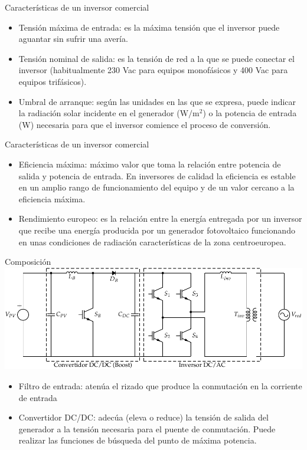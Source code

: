 \documentclass[xcolor={usenames,svgnames,dvipsnames}]{beamer}
\begin{document}
\begin{frame}[label=sec-2-0-7]{Características de un inversor comercial}
\begin{itemize}
\item \alert{Tensión máxima de entrada}: es la máxima tensión que el inversor
puede aguantar sin sufrir una avería.

\item \alert{Tensión nominal de salida}: es la tensión de red a la que se puede
conectar el inversor (habitualmente 230 Vac para equipos monofásicos
y 400 Vac para equipos trifásicos).

\item \alert{Umbral de arranque}: según las unidades en las que se expresa, puede
indicar la radiación solar incidente en el generador
($\si{\watt\per\meter\squared}$) o la potencia de entrada (W)
necesaria para que el inversor comience el proceso de conversión.
\end{itemize}
\end{frame}

\begin{frame}[label=sec-2-0-8]{Características de un inversor comercial}
\begin{itemize}
\item \alert{Eficiencia máxima}: máximo valor que toma la relación entre potencia
de salida y potencia de entrada. En inversores de calidad la
eficiencia es estable en un amplio rango de funcionamiento del equipo
y de un valor cercano a la eficiencia máxima.

\item \alert{Rendimiento europeo}: es la relación entre la energía entregada por
un inversor que recibe una energía producida por un generador
fotovoltaico funcionando en unas condiciones de radiación
características de la zona centroeuropea.
\end{itemize}
\end{frame}

\begin{frame}[label=sec-2-0-9]{Composición}
\includegraphics[width=.9\linewidth]{../figs/InversorPV.pdf}

\begin{itemize}
\item \alert{Filtro de entrada}: atenúa el rizado que produce la conmutación en
la corriente de entrada

\item \alert{Convertidor DC/DC}: adecúa (eleva o reduce) la tensión de salida del
generador a la tensión necesaria para el puente de conmutación. Puede
realizar las funciones de búsqueda del punto de máxima potencia.
\end{itemize}
\end{frame}
\end{document}
